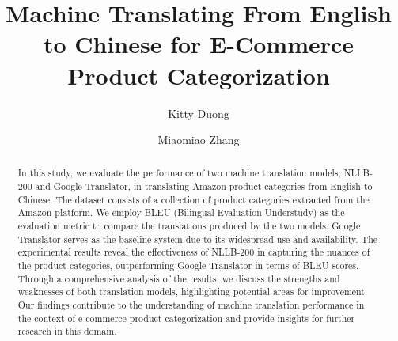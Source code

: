 \documentclass[sigconf]{acmart}
\begin{document}
\title{Machine Translating From English to Chinese for E-Commerce Product Categorization}



\author{Kitty Duong}

\author{Miaomiao Zhang}

\begin{abstract}
    In this study, we evaluate the performance of two machine translation models, NLLB-200\cite{nllb} and Google Translator\cite{baccouri}, in translating Amazon product categories\cite{amazonPromptCloud} from English to Chinese. The dataset consists of a collection of product categories extracted from the Amazon platform. We employ BLEU (Bilingual Evaluation Understudy)\cite{nltk.align.bleu_score_nltk_3.0_documentation} as the evaluation metric to compare the translations produced by the two models. Google Translator serves as the baseline system due to its widespread use and availability. The experimental results reveal the effectiveness of NLLB-200\cite{koishekenov_berard_nikoulina_2023} in capturing the nuances of the product categories, outperforming Google Translator in terms of BLEU scores. Through a comprehensive analysis of the results, we discuss the strengths and weaknesses of both translation models\cite{gauch_hwang_fick_2003}, highlighting potential areas for improvement. Our findings contribute to the understanding of machine translation performance\cite{flach_2019} in the context of e-commerce product categorization and provide insights for further research in this domain.
\end{abstract}



\maketitle
\end{document}
